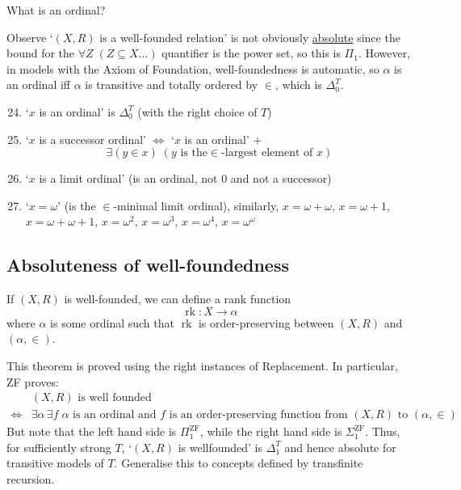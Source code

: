 \documentclass{article}
\newcommand{\named}[1]{\textbf{#1}\index{#1}}
\DeclareMathOperator{\rk}{rk}
\begin{document}
What is an ordinal?

Observe `$(X,R)$ is a well-founded relation' is not obviously \hyperlink{def:abso}{absolute} since the bound for the $\forall Z\; (Z \subseteq X \dots)$ quantifier is the power set, so this is \hyperlink{def:pi1}{$\Pi_1$}.
However, in models with the Axiom of Foundation, well-foundedness is automatic, so $\alpha$ is an ordinal iff $\alpha$ is transitive and totally ordered by $\in$, which is \hyperlink{def:delta0t}{$\Delta_0^T$}.

\begin{enumerate}
  \setcounter{enumi}{23}
  \item \newlec`$x$ is an ordinal' is \hyperlink{def:delta0t}{$\Delta_0^T$} (with the right choice of $T$)
  \item `$x$ is a successor ordinal' $\iff$ `$x$ is an ordinal' +
      \begin{equation*}\exists (y \in x) \; (y\text{ is the}\in\text{-largest element of }x )\end{equation*}
    \item `$x$ is a limit ordinal' (is an ordinal, not $0$ and not a successor)
    \item `$x = \omega$' (is the $\in$-minimal limit ordinal), similarly, $x = \omega + \omega$, $x = \omega + 1$, $x = \omega + \omega + 1$, $x = \omega^2$, $x = \omega^3$, $x = \omega^4$, $x = \omega^\omega$
\end{enumerate}

\subsection{Absoluteness of well-foundedness}
If $(X,R)$ is well-founded, we can define a rank function
\begin{equation*}
  \rk: X \to \alpha
\end{equation*}
where $\alpha$ is some ordinal such that $\rk$ is order-preserving between $(X,R)$ and $(\alpha,\in)$.

This theorem is proved using the right instances of Replacement.
In particular, ZF proves:
\begin{align*}
  &(X,R) \text{ is well founded} \\
  \iff &\exists\alpha\,\exists f \;\alpha \text{ is an ordinal and } f \text{ is an order-preserving function from }(X,R) \text{ to }(\alpha,\in)
\end{align*}
But note that the left hand side is $\Pi_1^{\text{ZF}}$, while the right hand side is $\Sigma_1^{\text{ZF}}$.
Thus, for sufficiently strong $T$, `$(X,R)$ is wellfounded' is $\Delta_1^T$ and hence absolute for transitive models of $T$.
Generalise this to concepts defined by transfinite recursion.
\end{document}
